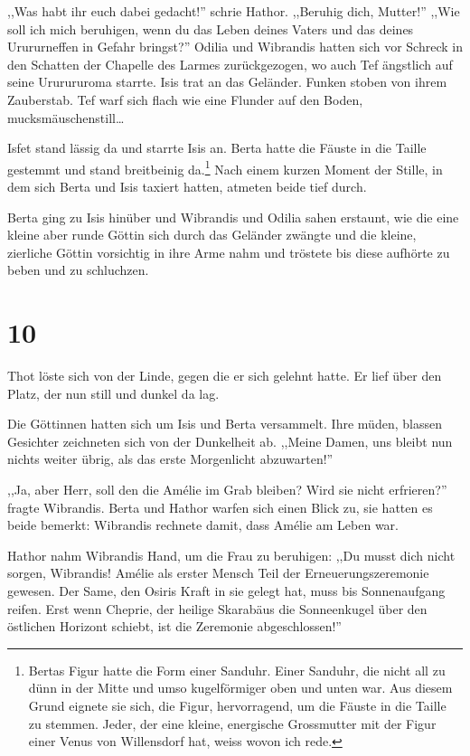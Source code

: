 ,,Was habt ihr euch dabei gedacht!'' schrie Hathor. ,,Beruhig dich, Mutter!'' ,,Wie soll ich mich beruhigen, wenn du das Leben deines Vaters und das deines Urururneffen in Gefahr bringst?'' Odilia und Wibrandis hatten sich vor Schreck in den Schatten der Chapelle des Larmes zurückgezogen, wo auch Tef ängstlich auf seine Ururururoma starrte. Isis trat an das Geländer. Funken stoben von ihrem Zauberstab. Tef warf sich flach wie eine Flunder auf den Boden, mucksmäuschenstill\dots

Isfet stand lässig da und starrte Isis an. Berta hatte die Fäuste in die Taille gestemmt und stand breitbeinig da.\footnote{Bertas Figur hatte die Form einer Sanduhr. Einer Sanduhr, die nicht all zu dünn in der Mitte und umso kugelförmiger oben und unten war. Aus diesem Grund eignete sie sich, die Figur, hervorragend, um die Fäuste in die Taille zu stemmen. Jeder, der eine kleine, energische Grossmutter mit der Figur einer Venus von Willensdorf hat, weiss wovon ich rede.} Nach einem kurzen Moment der Stille, in dem sich Berta und Isis taxiert hatten, atmeten beide tief durch.

Berta ging zu Isis hinüber und Wibrandis und Odilia sahen erstaunt, wie die eine kleine aber runde Göttin sich durch das Geländer zwängte und die kleine, zierliche Göttin vorsichtig in ihre Arme nahm und tröstete bis diese aufhörte zu beben und zu schluchzen.

\section*{10}

Thot löste sich von der Linde, gegen die er sich gelehnt hatte. Er lief über den Platz, der nun still und dunkel da lag.

Die Göttinnen hatten sich um Isis und Berta versammelt. Ihre müden, blassen Gesichter zeichneten sich von der Dunkelheit ab. ,,Meine Damen, uns bleibt nun nichts weiter übrig, als das erste Morgenlicht abzuwarten!'' 

,,Ja, aber Herr, soll den die Amélie im Grab bleiben? Wird sie nicht erfrieren?'' fragte Wibrandis. Berta und Hathor warfen sich einen Blick zu, sie hatten es beide bemerkt: Wibrandis rechnete damit, dass Amélie am Leben war.

Hathor nahm Wibrandis Hand, um die Frau zu beruhigen: ,,Du musst dich nicht sorgen, Wibrandis! Amélie als erster Mensch Teil der Erneuerungszeremonie gewesen. Der Same, den Osiris Kraft in sie gelegt hat, muss bis Sonnenaufgang reifen. Erst wenn Cheprie, der heilige Skarabäus die Sonneenkugel über den östlichen Horizont schiebt, ist die Zeremonie abgeschlossen!''

